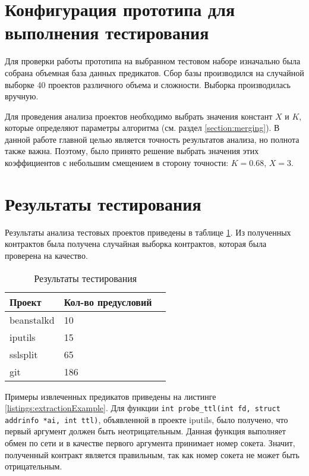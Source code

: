 \section{Конфигурация прототипа для выполнения тестирования}
Для проверки работы прототипа на выбранном тестовом наборе изначально была собрана объемная база данных предикатов. Сбор базы производился на случайной выборке 40 проектов различного объема и сложности. Выборка производилась вручную.

Для проведения анализа проектов необходимо выбрать значения констант $X$ и $K$, которые определяют параметры алгоритма (см. раздел \ref{section:merging}). В данной работе главной целью является точность результатов анализа, но полнота также важна. Поэтому, было принято решение выбрать значения этих коэффициентов с небольшим смещением в сторону точности: $K=0.68$, $X=3$.

\section{Результаты тестирования}
Результаты анализа тестовых проектов приведены в таблице \ref{table:testing}. Из полученных контрактов была получена случайная выборка контрактов, которая была проверена на качество.

\begin{table}
	\caption{Результаты тестирования}
	\begin{center}
	\begin{tabular}{|l|l|l|}
	\hline 
	\textbf{Проект} & \textbf{Кол-во предусловий}	\\ 
	\hline 
	beanstalkd & 10 \\ 
	\hline 
	iputils & 15  \\ 
	\hline 
	sslsplit & 65 \\
	\hline 
	git & 186 \\ 
	\hline 
	\end{tabular} 
	\end{center}
	\label{table:testing}
\end{table}

Примеры извлеченных предикатов приведены на листинге \ref{listings:extractionExample}. Для функции \texttt{int probe_ttl(int fd, struct addrinfo *ai, int ttl)}, объявленной в проекте iputils, было получено, что первый аргумент должен быть неотрицательным. Данная функция выполняет обмен по сети и в качестве первого аргумента принимает номер сокета. Значит, полученный контракт является правильным, так как номер сокета не может быть отрицательным.

